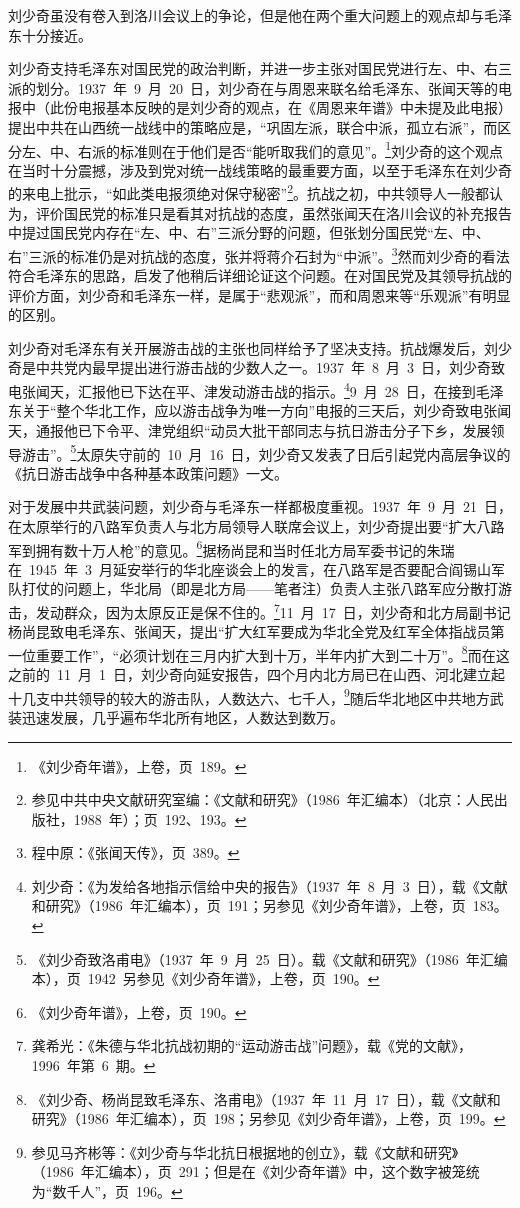 刘少奇虽没有卷入到洛川会议上的争论，但是他在两个重大问题上的观点却与毛泽东十分接近。

刘少奇支持毛泽东对国民党的政治判断，并进一步主张对国民党进行左、中、右三派的划分。1937~年~9~月~20~日，刘少奇在与周恩来联名给毛泽东、张闻天等的电报中（此份电报基本反映的是刘少奇的观点，在《周恩来年谱》中未提及此电报）提出中共在山西统一战线中的策略应是，“巩固左派，联合中派，孤立右派”，而区分左、中、右派的标准则在于他们是否“能听取我们的意见”。\footnote{《刘少奇年谱》，上卷，页~189。}刘少奇的这个观点在当时十分震撼，涉及到党对统一战线策略的最重要方面，以至于毛泽东在刘少奇的来电上批示，“如此类电报须绝对保守秘密”\footnote{参见中共中央文献研究室编：《文献和研究》（1986~年汇编本）（北京：人民出版社，1988~年）；页~192、193。}。抗战之初，中共领导人一般都认为，评价国民党的标准只是看其对抗战的态度，虽然张闻天在洛川会议的补充报告中提过国民党内存在“左、中、右”三派分野的问题，但张划分国民党“左、中、右”三派的标准仍是对抗战的态度，张并将蒋介石封为“中派”。\footnote{程中原：《张闻天传》，页~389。}然而刘少奇的看法符合毛泽东的思路，启发了他稍后详细论证这个问题。在对国民党及其领导抗战的评价方面，刘少奇和毛泽东一样，是属于“悲观派”，而和周恩来等“乐观派”有明显的区别。

刘少奇对毛泽东有关开展游击战的主张也同样给予了坚决支持。抗战爆发后，刘少奇是中共党内最早提出进行游击战的少数人之一。1937~年~8~月~3~日，刘少奇致电张闻天，汇报他已下达在平、津发动游击战的指示。\footnote{刘少奇：《为发给各地指示信给中央的报告》（1937~年~8~月~3~日），载《文献和研究》（1986~年汇编本），页~191；另参见《刘少奇年谱》，上卷，页~183。}9~月~28~日，在接到毛泽东关于“整个华北工作，应以游击战争为唯一方向”电报的三天后，刘少奇致电张闻天，通报他已下令平、津党组织“动员大批干部同志与抗日游击分子下乡，发展领导游击”。\footnote{《刘少奇致洛甫电》（1937~年~9~月~25~日）。载《文献和研究》（1986~年汇编本），页~1942~另参见《刘少奇年谱》，上卷，页~190。}太原失守前的~10~月~16~日，刘少奇又发表了日后引起党内高层争议的《抗日游击战争中各种基本政策问题》一文。

对于发展中共武装问题，刘少奇与毛泽东一样都极度重视。1937~年~9~月~21~日，在太原举行的八路军负责人与北方局领导人联席会议上，刘少奇提出要“扩大八路军到拥有数十万人枪”的意见。\footnote{《刘少奇年谱》，上卷，页~190。}据杨尚昆和当时任北方局军委书记的朱瑞在~1945~年~3~月延安举行的华北座谈会上的发言，在八路军是否要配合阎锡山军队打仗的问题上，华北局（即是北方局——笔者注）负责人主张八路军应分散打游击，发动群众，因为太原反正是保不住的。\footnote{龚希光：《朱德与华北抗战初期的“运动游击战”问题》，载《党的文献》，1996~年第~6~期。}11~月~17~日，刘少奇和北方局副书记杨尚昆致电毛泽东、张闻天，提出“扩大红军要成为华北全党及红军全体指战员第一位重要工作”，“必须计划在三月内扩大到十万，半年内扩大到二十万”。\footnote{《刘少奇、杨尚昆致毛泽东、洛甫电》（1937~年~11~月~17~日），载《文献和研究》（1986~年汇编本），页~198；另参见《刘少奇年谱》，上卷，页~199。}而在这之前的~11~月~1~日，刘少奇向延安报告，四个月内北方局已在山西、河北建立起十几支中共领导的较大的游击队，人数达六、七千人，\footnote{参见马齐彬等：《刘少奇与华北抗日根据地的创立》，载《文献和研究》（1986~年汇编本），页~291；但是在《刘少奇年谱》中，这个数字被笼统为“数千人”，页~196。}随后华北地区中共地方武装迅速发展，几乎遍布华北所有地区，人数达到数万。

